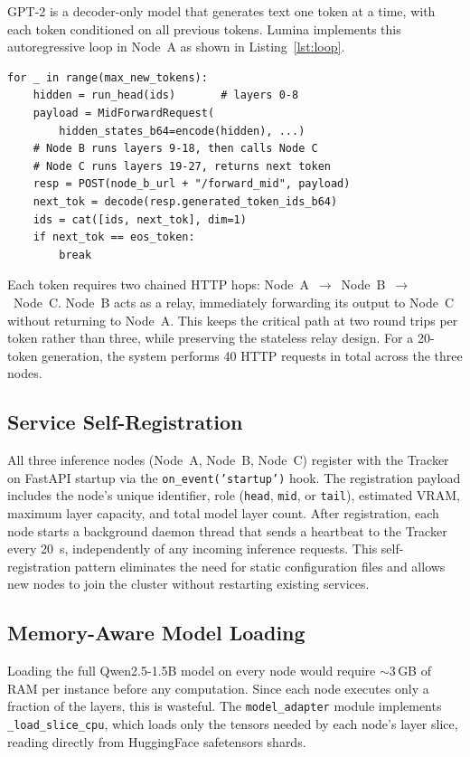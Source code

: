\documentclass[conference]{IEEEtran}
\begin{document}
GPT-2 is a decoder-only model that generates text one token at a time, with
each token conditioned on all previous tokens. Lumina implements this
autoregressive loop in Node~A as shown in Listing~\ref{lst:loop}.

\begin{lstlisting}[caption={Autoregressive generation loop in Node A.}, label={lst:loop}]
for _ in range(max_new_tokens):
    hidden = run_head(ids)       # layers 0-8
    payload = MidForwardRequest(
        hidden_states_b64=encode(hidden), ...)
    # Node B runs layers 9-18, then calls Node C
    # Node C runs layers 19-27, returns next token
    resp = POST(node_b_url + "/forward_mid", payload)
    next_tok = decode(resp.generated_token_ids_b64)
    ids = cat([ids, next_tok], dim=1)
    if next_tok == eos_token:
        break
\end{lstlisting}

Each token requires two chained HTTP hops: Node~A~$\to$~Node~B~$\to$~Node~C.
Node~B acts as a relay, immediately forwarding its output to Node~C without
returning to Node~A. This keeps the critical path at two round trips per token
rather than three, while preserving the stateless relay design. For a 20-token
generation, the system performs 40 HTTP requests in total across the three
nodes.

\subsection{Service Self-Registration}

All three inference nodes (Node~A, Node~B, Node~C) register with the Tracker
on FastAPI startup via the \texttt{on\_event('startup')} hook. The registration
payload includes the node's unique identifier, role (\texttt{head},
\texttt{mid}, or \texttt{tail}), estimated VRAM, maximum layer capacity, and
total model layer count. After registration, each node starts a background
daemon thread that sends a heartbeat to the Tracker every 20~s,
independently of any incoming inference requests. This self-registration
pattern eliminates the need for static configuration files and allows new
nodes to join the cluster without restarting existing services.

\subsection{Memory-Aware Model Loading}

Loading the full Qwen2.5-1.5B model on every node would require $\sim$3\,GB
of RAM per instance before any computation. Since each node executes only a
fraction of the layers, this is wasteful. The \texttt{model\_adapter} module
implements \texttt{\_load\_slice\_cpu}, which loads only the tensors needed by
each node's layer slice, reading directly from HuggingFace safetensors shards.
\end{document}
